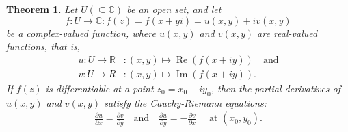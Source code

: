 \documentclass[12pt,openany]{book}
\newtheorem{theorem}{Theorem}[chapter]
\theoremstyle{definition}
\newcommand{\R}{\mathbb{R}}
\newcommand{\C}{\mathbb{C}}
\newcommand{\of}[1]{\left( #1 \right)}
\renewcommand{\Re}{\operatorname{Re}}
\renewcommand{\Im}{\operatorname{Im}}
\begin{document}
	
	\begin{tcolorbox}[colframe=thmcolor, title={\color{white}\bf Cauchy-Riemann Equations}]
		\begin{theorem}
			Let $U\of{\subseteq\C}$ be an open set, and let \[f:U\to\C:f(z) =f\of{x+yi} = u(x, y) + iv(x, y)
			\] be a complex-valued function, where $u(x, y)$ and $v(x, y)$ are real-valued functions, that is, \begin{align*}
			u:U\to\R&:(x,y)\mapsto \Re\of{f(x+iy)}\quad\text{and}\\ v:U\to R&:\of{x,y}\mapsto\Im\of{f(x+iy)}.
			\end{align*} If $f(z)$ is differentiable at a point $z_0 = x_0 + iy_0$, then the partial derivatives of $u(x, y)$ and $v(x, y)$ satisfy the Cauchy-Riemann equations: \begin{align*}
			\frac{\partial u}{\partial x}= \frac{\partial v}{\partial y}\quad\text{and}\quad
			\frac{\partial u}{\partial y}= -\frac{\partial v}{\partial x}\quad\text{ at $(x_0, y_0)$}.
			\end{align*}
		\end{theorem}
	\end{tcolorbox}
	
\end{document}
